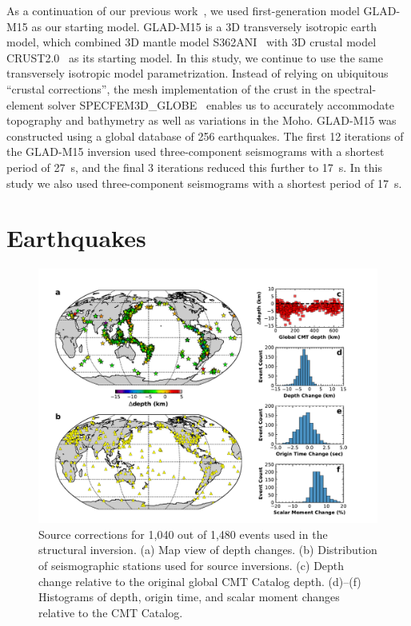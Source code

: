 \documentclass[extra,mreferee]{gji}
\begin{document}
As a continuation of our previous work~\citep{bozdaug2016global},
we used first-generation model GLAD-M15 as our
starting model.
GLAD-M15 is a 3D transversely isotropic earth model, which combined
3D mantle model S362ANI~\citep{kustowski2008anisotropic}
with 3D crustal model CRUST2.0~\citep{bassin2000current} as its starting model.
In this study,
we continue to use the same transversely isotropic model parametrization.
Instead of relying on ubiquitous ``crustal corrections'',
the mesh implementation of the crust in the spectral-element solver SPECFEM3D\_GLOBE~\citep{KoTr02a,KoTr02b,PeKoLuMaLeCaLeMaLiBlNiBaTr11} enables us to accurately accommodate topography and bathymetry as well as variations in the Moho.
GLAD-M15 was constructed using a global database of 256 earthquakes.
The first 12 iterations of the GLAD-M15 inversion used three-component seismograms with a shortest period of 27~s,
and the final 3 iterations reduced this further to 17~s.
In this study we also used three-component seismograms with a shortest period of 17~s.

\section{Earthquakes}
\label{section:earthquakes}

\begin{figure}
  \centering
  \includegraphics[width=\textwidth]{figures/source_corrections.pdf}
  \caption{Source corrections for 1,040 out of 1,480 events used in the structural inversion. (a) Map view of depth changes. (b) Distribution of seismographic stations used for source inversions. (c) Depth change relative to the original global CMT Catalog depth. (d)--(f) Histograms of depth, origin time, and scalar moment changes relative to the CMT Catalog.
  }
  \label{fig:source_correction}
\end{figure}
\end{document}
